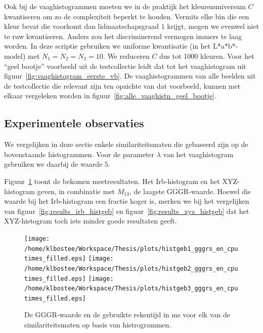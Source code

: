 Ook bij de vaaghistogrammen moeten we in de praktijk het kleurenuniversum $C$ 
kwantiseren om zo de complexiteit beperkt te houden. Vermits elke bin die een kleur
bevat die voorkomt dan lidmaatschapsgraad $1$ krijgt, mogen we evenwel niet te
ruw kwantiseren. Anders zou het discriminerend vermogen immers te laag worden. In deze
scriptie gebruiken we uniforme kwantisatie (in het L*a*b*-model) met $N_1=N_2=N_3=10$.
We reduceren $C$ dus tot 1000 kleuren. Voor het ``geel bootje'' voorbeeld uit de testcollectie
leidt dat tot het vaaghistogram uit figuur~\ref{fig:vaaghistogram_eerste_vb}. De vaaghistogrammen 
van alle beelden
uit de testcollectie die relevant zijn ten opzichte van dat voorbeeld, kunnen met
elkaar vergeleken worden in figuur~\ref{fig:alle_vaaghistn_geel_bootje}.

\subsection{Experimentele observaties}

We vergelijken in deze sectie enkele similariteitsmaten die gebaseerd zijn op de bovenstaande
histogrammen. Voor de parameter $\lambda$ van het vaaghistogram gebruiken we daarbij
de waarde $5$.

Figuur~\ref{fig:histgeb_gggrs_en_cputimes} toont de bekomen meetresultaten. Het Irb-histogram
en het XYZ-histogram geven, in combinatie met $M_{13}$, de laagste GGGR-waarde. Hoewel die
waarde bij het Irb-histogram een fractie hoger is, merken we bij het vergelijken van 
figuur~\ref{fig:results_irb_histgeb} en figuur~\ref{fig:results_xyz_histgeb} dat het 
XYZ-histogram toch iets minder goede resultaten geeft. 

\begin{figure}[tbp]
\begin{center}
\texttt{[image: /home/klbostee/Workspace/Thesis/plots/histgeb1\_gggrs\_en\_cputimes\_filled.eps]} 
\texttt{[image: /home/klbostee/Workspace/Thesis/plots/histgeb2\_gggrs\_en\_cputimes\_filled.eps]}
\texttt{[image: /home/klbostee/Workspace/Thesis/plots/histgeb3\_gggrs\_en\_cputimes\_filled.eps]}
\caption{\label{fig:histgeb_gggrs_en_cputimes}De GGGR-waarde en de gebruikte rekentijd in ms voor elk 
van de similariteitsmaten op basis van histrogrammen.}
\end{center}
\end{figure}

